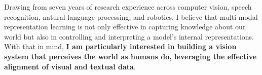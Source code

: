 \documentclass[10pt, letterpaper]{awesome-cv} %
\begin{document}
\makecvheader %

\begin{cvletter}
\vspace*{-0.05cm}
Drawing from seven years of research experience across computer vision, speech recognition, natural language processing, and robotics, I believe that multi-modal representation learning is not only effective in capturing knowledge about our world but also in controlling and interpreting a model’s internal representations. With that in mind, \textbf{I am particularly interested in building a vision system that perceives the world as humans do, leveraging the effective alignment of visual and textual data}.
\end{cvletter}








%
%
%

\end{document}
